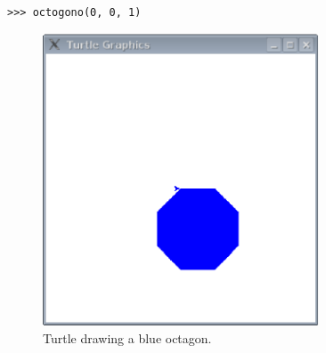 \begin{listing}
\begin{verbatim}
>>> octogono(0, 0, 1)
\end{verbatim}
\end{listing}

\begin{figure}
\begin{center}
\includegraphics[width=82mm]{eps/figure49.eps}
\end{center}
\caption{Turtle drawing a blue octagon.}\label{fig49}
\end{figure}
\newpage
